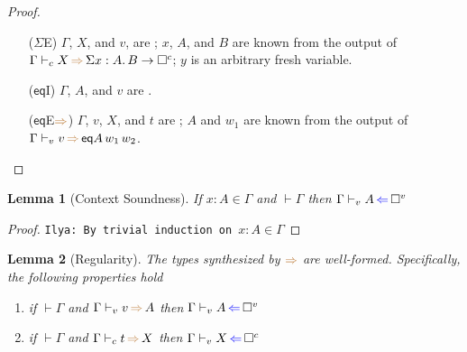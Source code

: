 \documentclass[a4,natbib=false]{article}
\newtheorem{lemma}{Lemma}
\newcommand{\ilyam}[1]{{\color{red} \texttt{Ilya:  #1}}}
\newcommand{\unival}{\square^{v}}
\newcommand{\unicomp}{\square^{c}}
\newcommand{\sigmatype}[2]{\Sigma {#1}.\,#2}
\newcommand{\eqtype}[3]{\mathsf{eq}{#1}\,{#2}\,{#3}}
\newcommand{\judgectx}[2]{{#1} \vdash {#2}}
\newcommand{\checks}{{\color{blue} \Leftarrow}}
\newcommand{\infers}{{\color{brown} \Rightarrow}}
\newcommand{\judgecInfer}[3]{{#1} \vdash_{c} {#2} \, \infers \, {#3}}
\newcommand{\judgevCheck}[3]{{#1} \vdash_{v} {#2} \, \checks \, {#3}}
\newcommand{\judgevInfer}[3]{{#1} \vdash_{v} {#2} \, \infers \, {#3}}
\newcommand{\judgeInctx}[2]{{#1} \in {#2}}
\begin{document}
\begin{proof}
\begin{multicols}{2}
\begin{itemize}
      \item[($\Sigma$E)]
        $\Gamma$, $X$, and $v$, are \fromconcl;
        $x$, $A$, and $B$ are known from the output of
        $\judgecInfer{\Gamma}{X}{\sigmatype{x:A}{B} \to \unicomp}$;
        $y$ is an arbitrary fresh variable.
        
      \item[($\mathsf{eq}$I)]
        $\Gamma$, $A$, and $v$ are \fromconcl.

      \item[($\mathsf{eq}$E$\infers$)]
        $\Gamma$, $v$, $X$, and $t$ are \fromconcl;
        $A$ and $w_1$ are known from the output of $\judgevInfer{\Gamma}{v}{\eqtype{A}{w_1}{w_2}}$.
  \end{itemize}
  \end{multicols}


\end{proof}

\begin{lemma}[Context Soundness]
  \label{lemma:ctx-soundness}
  If $\judgeInctx{x:A}{\Gamma}$ and $\judgectx{}{\Gamma}$ then $\judgevCheck{\Gamma}{A}{\unival}$
\end{lemma}
\begin{proof}
  \ilyam{By trivial induction on $\judgeInctx{x:A}{\Gamma}$}
\end{proof}

\begin{lemma}[Regularity]
  The types synthesized by $\infers$ are well-formed. Specifically, the following properties hold
  \begin{enumerate}
  \item if $\judgectx{}{\Gamma}$ and $\judgevInfer{\Gamma}{v}{A}$ then $\judgevCheck{\Gamma}{A}{\unival}$
  \item if $\judgectx{}{\Gamma}$ and $\judgecInfer{\Gamma}{t}{X}$ then $\judgevCheck{\Gamma}{X}{\unicomp}$
  \end{enumerate}
\end{lemma}
\end{document}
